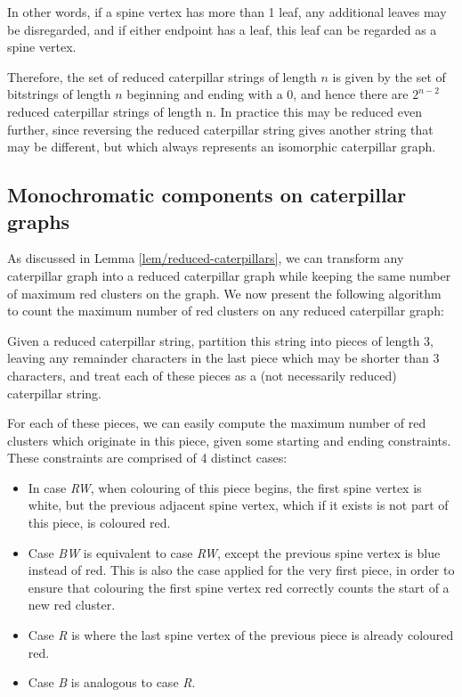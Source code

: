 \documentclass{mpaper}
\begin{document}
In other words, if a spine vertex has more than 1 leaf, any additional leaves may be disregarded, and if either endpoint has a leaf, this leaf can be regarded as a spine vertex.

Therefore, the set of reduced caterpillar strings of length $n$ is given by the set of bitstrings of length $n$ beginning and ending with a $0$, and hence there are $2^{n-2}$ reduced caterpillar strings of length n. In practice this may be reduced even further, since reversing the reduced caterpillar string gives another string that may be different, but which always represents an isomorphic caterpillar graph.

\subsection{Monochromatic components on caterpillar graphs}
\vspace{1em}

As discussed in Lemma \ref{lem/reduced-caterpillars}, we can transform any caterpillar graph into a reduced caterpillar graph while keeping the same number of maximum red clusters on the graph. We now present the following algorithm to count the maximum number of red clusters on any reduced caterpillar graph:

Given a reduced caterpillar string, partition this string into pieces of length 3, leaving any remainder characters in the last piece which may be shorter than 3 characters, and treat each of these pieces as a (not necessarily reduced) caterpillar string.

For each of these pieces, we can easily compute the maximum number of red clusters which originate in this piece, given some starting and ending constraints. These constraints are comprised of 4 distinct cases:

\begin{itemize}
  \item In case \emph{RW}, when colouring of this piece begins, the first spine vertex is white, but the previous adjacent spine vertex, which if it exists is not part of this piece, is coloured red.
  \item Case \emph{BW} is equivalent to case \emph{RW}, except the previous spine vertex is blue instead of red. This is also the case applied for the very first piece, in order to ensure that colouring the first spine vertex red correctly counts the start of a new red cluster.
  \item Case \emph{R} is where the last spine vertex of the previous piece is already coloured red.
  \item Case \emph{B} is analogous to case \emph{R}.
\end{itemize}
\end{document}
